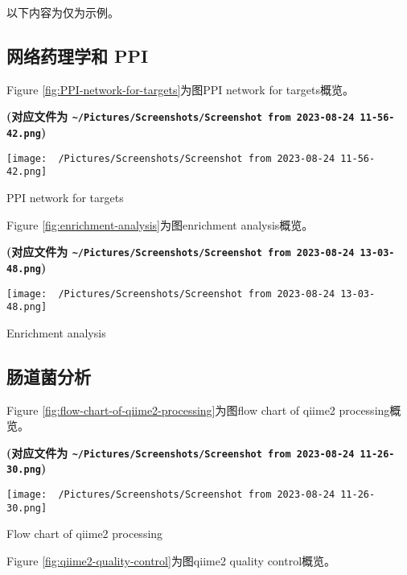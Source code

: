 \documentclass[
]{article}
\begin{document}
以下内容为仅为示例。

\hypertarget{ux7f51ux7edcux836fux7406ux5b66ux548c-ppi}{%
\subsection{网络药理学和 PPI}\label{ux7f51ux7edcux836fux7406ux5b66ux548c-ppi}}

Figure \ref{fig:PPI-network-for-targets}为图PPI network for targets概览。

\textbf{(对应文件为 \texttt{\textasciitilde{}/Pictures/Screenshots/Screenshot\ from\ 2023-08-24\ 11-56-42.png})}

\def\@captype{figure}
\begin{center}
\texttt{[image: ~/Pictures/Screenshots/Screenshot from 2023-08-24 11-56-42.png]}
\caption{PPI network for targets}\label{fig:PPI-network-for-targets}
\end{center}

Figure \ref{fig:enrichment-analysis}为图enrichment analysis概览。

\textbf{(对应文件为 \texttt{\textasciitilde{}/Pictures/Screenshots/Screenshot\ from\ 2023-08-24\ 13-03-48.png})}

\def\@captype{figure}
\begin{center}
\texttt{[image: ~/Pictures/Screenshots/Screenshot from 2023-08-24 13-03-48.png]}
\caption{Enrichment analysis}\label{fig:enrichment-analysis}
\end{center}

\hypertarget{ux80a0ux9053ux83ccux5206ux6790}{%
\subsection{肠道菌分析}\label{ux80a0ux9053ux83ccux5206ux6790}}

Figure \ref{fig:flow-chart-of-qiime2-processing}为图flow chart of qiime2 processing概览。

\textbf{(对应文件为 \texttt{\textasciitilde{}/Pictures/Screenshots/Screenshot\ from\ 2023-08-24\ 11-26-30.png})}

\def\@captype{figure}
\begin{center}
\texttt{[image: ~/Pictures/Screenshots/Screenshot from 2023-08-24 11-26-30.png]}
\caption{Flow chart of qiime2 processing}\label{fig:flow-chart-of-qiime2-processing}
\end{center}

Figure \ref{fig:qiime2-quality-control}为图qiime2 quality control概览。
\end{document}
